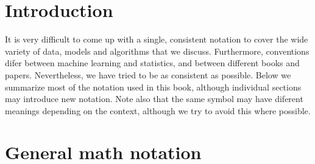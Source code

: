
\section*{Introduction}
It is very difficult to come up with a single, consistent notation to cover the wide variety of
data, models and algorithms that we discuss. Furthermore, conventions difer between machine
learning and statistics, and between different books and papers. Nevertheless, we have tried
to be as consistent as possible. Below we summarize most of the notation used in this book,
although individual sections may introduce new notation. Note also that the same symbol may
have diferent meanings depending on the context, although we try to avoid this where possible.


\section*{General math notation}

